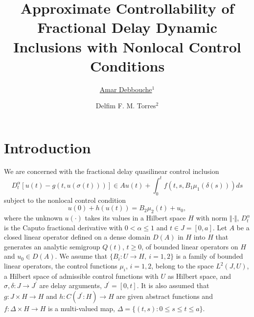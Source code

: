\documentclass[a4paper,11pt,twoside]{article}
\begin{document}
\title{Approximate Controllability of Fractional Delay Dynamic Inclusions with Nonlocal Control Conditions}

\author{\underline{Amar Debbouche$^1$} \and Delfim F. M. Torres$^2$}
\address{$^1$Guelma University, Algeria\hspace{0.5cm}$^2$University of Aveiro, Portugal}




\makeppage


\section{Introduction}

We are concerned with the fractional delay quasilinear control inclusion
\begin{equation}
\label{eq:1.1}
D^{\alpha}_{t}[u(t)-g(t, u(\sigma(t)))]\in Au(t)
+\int_{0}^{t}f(t, s, B_{1}\mu_{1}(\delta(s)))ds
\end{equation}
subject to the nonlocal control condition
\begin{equation}
\label{eq:1.2}
u(0)+h(u(t))=B_{2}\mu_{2}(t)+u_{0},
\end{equation}
where the unknown $u(\cdot)$ takes its values in a Hilbert space $H$
with norm $\Vert\cdot\Vert$, $D^{\alpha}_{t}$ is the Caputo fractional
derivative with $0<\alpha\leq1$ and $t\in J=[0,a]$. Let $A$ be a closed linear
operator defined on a dense domain $D(A)$ in $H$ into $H$ that generates
an analytic semigroup $Q(t)$, $t\geq 0$, of bounded linear operators on $H$
and $u_{0}\in D(A)$. We assume that $\lbrace B_{i}: U\rightarrow H,~ i=1,2\rbrace$
is a family of bounded linear operators, the control functions $\mu_{i}$, $i=1,2$,
belong to the space $L^{2}(J, U)$, a Hilbert space of admissible control functions
with $U$ as Hilbert space, and $\sigma, \delta: J\rightarrow J^{\prime}$ are delay arguments,
$J^{\prime}=[0, t]$. It is also assumed that $g: J\times H\rightarrow H$
and $h: C(J^{\prime}: H)\rightarrow H$ are given abstract functions and
$f: \Delta\times H\rightarrow H$ is a multi-valued map,
$\Delta=\lbrace (t, s): 0\leq s\leq t\leq a\rbrace$.
\end{document}
